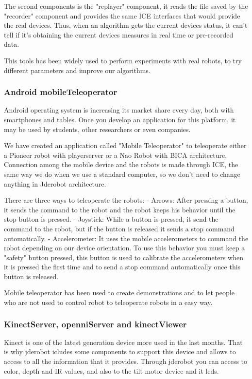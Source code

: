 \documentclass[twocolumn]{svjour3}          %
\begin{document}
The second components is the "replayer" component, it reads the file saved by the "recorder" component and provides the same ICE interfaces that would provide the real devices. Thus, when an algorithm gets the current devices status, it can't tell if it's obtaining the current devices measures in real time or pre-recorded data.

This tools has been widely used to perform experiments with real robots, to try different parameters and improve our algorithms.

\subsubsection{Android mobileTeleoperator}

Android operating system is increasing its market share every day, both with smartphones and tables. Once you develop an application for this platform, it may be used by students, other researchers or even companies. 

We have created an application called "Mobile Teleoperator" to teleoperate either a Pioneer robot with playerserver or a Nao Robot with BICA architecture. Connection among the mobile device and the robots is made through ICE, the same way we do when we use a standard computer, so we don't need to change anything in Jderobot architecture.

There are three ways to teleoperate the robots:
- Arrows: After pressing a button, it sends the command to the robot and the robot keeps his behavior until the stop button is pressed.
- Joystick: While a button is pressed, it send the command to the robot, but if the button is released it sends a stop command automatically.
- Accelerometer: It uses the mobile accelerometers to command the robot depending on our device orientation. To use this behavior you must keep a "safety" button pressed, this button is used to calibrate the accelerometers when it is pressed the first time and to send a stop command automatically once this button is released.

Mobile teleoperator has been used to create demonstrations and to let people who are not used to control robot to teleoperate robots in a easy way.


\subsubsection{KinectServer, openniServer and kinectViewer}
Kinect is one of the latest generation device more used in the last months. That is why jderobot icludes some components to support this device and allows to access to all the information that it provides. Through jderobot you can access to color, depth and IR values, and also to the tilt motor device and it leds.
\end{document}
